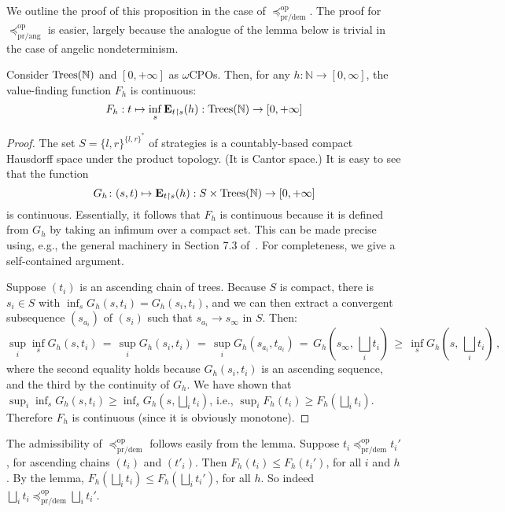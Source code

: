 \documentclass[a4paper,UKenglish]{lipics-v2018}
\newcommand{\Tree}{\textnormal{Trees}} %
\newcommand{\Basicleq}{\preccurlyeq}
\newcommand{\prang}{\text{pr/ang}}
\newcommand{\prdem}{\text{pr/dem}}
\newcommand{\Op}{\text{op}}
\theoremstyle{plain}
\begin{document}
We outline the proof of this proposition in the case of $\Basicleq^\Op_\prdem$. The proof for  $\Basicleq^\Op_\prang$ is easier, largely because the analogue of the lemma below is trivial in the case of angelic nondeterminism.
\begin{lemma} 
\label{lemma:F-continuous}
Consider $\Tree(\mathbb{N})$ and $[0,+\infty]$ as $\omega$CPOs. Then,
for any $h \colon \mathbb{N} \to [0,\infty]$, 
the value-finding function $F_h$ is continuous:
\[F_h : t \mapsto \inf_s  \mathbf{E}_{t\restriction s} (h) : \Tree(\mathbb{N}) \to [0,+\infty]\]
\end{lemma}
\begin{proof}
The set $S = \{l,r\}^{\{l,r\}^*}$ of strategies is a countably-based compact Hausdorff space under the product topology. (It is Cantor space.)
It is easy to see that  the function 
\[G_h \colon (s,t) \mapsto \mathbf{E}_{t\restriction s} (h) : S \times \Tree(\mathbb{N})  \to [0,+\infty] \]
is continuous.
Essentially, it follows that $F_h$ is continuous because it is defined from $G_h$ by taking an infimum over a compact set. 
This can be made precise using, e.g.,  the general machinery in Section 7.3 of~\cite{AndreaShalk}. For completeness, we give a self-contained argument. 

Suppose $(t_i)$ is an ascending chain of trees.
Because $S$ is compact,  there is $s_i \in S$ with $\inf_s G_h(s,t_i) = G_h(s_i, t_i)$,
and we can then extract a convergent 
subsequence  $(s_{a_i})$ of $(s_i)$ such that $s_{a_i} \rightarrow s_\infty$ in $S$. Then:
\begin{equation*}
                \sup_i \inf_s G_h(s,t_i)
                \, =\, 
                \sup_i G_h(s_i, t_i)
                \, = \,
                \sup_i G_h(s_{a_i}, t_{a_i})
                \, = \,
                G_h(s_\infty, \, \bigsqcup_i t_i)
                \, \geq \,
                \inf_s  G_h(s, \, \bigsqcup_i t_i)\, ,
            \end{equation*}
where the second equality holds because $G_h(s_i, t_i)$ is an ascending sequence, and the third by the continuity of  $G_h$.
We have shown that $ \sup_i  \inf_s G_h(s,t_i) \geq \inf_s  G_h(s, \bigsqcup_i t_i)$, i.e., 
$ \sup_i  F_h(t_i) \geq F_h(\bigsqcup_i t_i)$. 
Therefore $F_h$ is continuous (since it is obviously monotone).
\end{proof}

\noindent
The admissibility of $\Basicleq^\Op_\prdem$ follows easily from the lemma.
Suppose $t_i \Basicleq^\Op_\prdem t_i'$, for ascending chains $(t_i)$ and $(t'_i)$.
Then $F_h(t_i) \leq F_h (t_i')$, for all $i$ and $h$. By the lemma, 
 $F_h (\bigsqcup_i t_i) \leq F_h (\bigsqcup_i t_i')$, for all $h$.
So indeed  $\bigsqcup_i t_i \Basicleq^\Op_\prdem \bigsqcup_i t_i'$.
\end{document}

